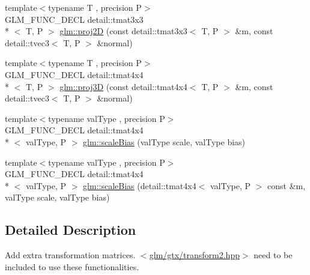 \begin{DoxyCompactItemize}
\item 
{\footnotesize template$<$typename T , precision P$>$ }\\G\-L\-M\-\_\-\-F\-U\-N\-C\-\_\-\-D\-E\-C\-L detail\-::tmat3x3\\*
$<$ T, P $>$ \hyperlink{group__gtx__transform2_gad51e1fa33875b966db2f97cb7f21c48a}{glm\-::proj2\-D} (const detail\-::tmat3x3$<$ T, P $>$ \&m, const detail\-::tvec3$<$ T, P $>$ \&normal)
\item 
{\footnotesize template$<$typename T , precision P$>$ }\\G\-L\-M\-\_\-\-F\-U\-N\-C\-\_\-\-D\-E\-C\-L detail\-::tmat4x4\\*
$<$ T, P $>$ \hyperlink{group__gtx__transform2_ga70a21b940727b94060fd3826eeacb048}{glm\-::proj3\-D} (const detail\-::tmat4x4$<$ T, P $>$ \&m, const detail\-::tvec3$<$ T, P $>$ \&normal)
\item 
{\footnotesize template$<$typename val\-Type , precision P$>$ }\\G\-L\-M\-\_\-\-F\-U\-N\-C\-\_\-\-D\-E\-C\-L detail\-::tmat4x4\\*
$<$ val\-Type, P $>$ \hyperlink{group__gtx__transform2_ga0a387ae1a7fd1a2ca451ac47833ee3e2}{glm\-::scale\-Bias} (val\-Type scale, val\-Type bias)
\item 
{\footnotesize template$<$typename val\-Type , precision P$>$ }\\G\-L\-M\-\_\-\-F\-U\-N\-C\-\_\-\-D\-E\-C\-L detail\-::tmat4x4\\*
$<$ val\-Type, P $>$ \hyperlink{group__gtx__transform2_gae733630f90c53ca3dce8daf50f25d6ab}{glm\-::scale\-Bias} (detail\-::tmat4x4$<$ val\-Type, P $>$ const \&m, val\-Type scale, val\-Type bias)
\end{DoxyCompactItemize}


\subsection{Detailed Description}
Add extra transformation matrices. $<$\hyperlink{transform2_8hpp}{glm/gtx/transform2.\-hpp}$>$ need to be included to use these functionalities. 

